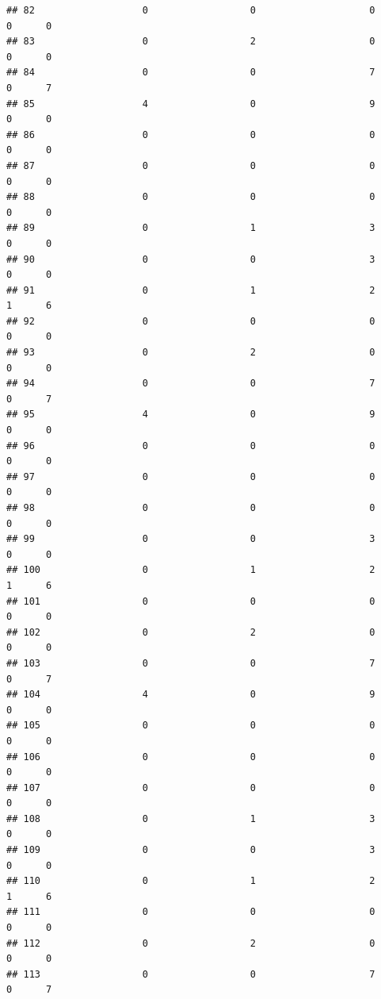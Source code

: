 \documentclass[
]{article}
\begin{document}
\begin{verbatim}
## 82                   0                  0                    0        0      0
## 83                   0                  2                    0        0      0
## 84                   0                  0                    7        0      7
## 85                   4                  0                    9        0      0
## 86                   0                  0                    0        0      0
## 87                   0                  0                    0        0      0
## 88                   0                  0                    0        0      0
## 89                   0                  1                    3        0      0
## 90                   0                  0                    3        0      0
## 91                   0                  1                    2        1      6
## 92                   0                  0                    0        0      0
## 93                   0                  2                    0        0      0
## 94                   0                  0                    7        0      7
## 95                   4                  0                    9        0      0
## 96                   0                  0                    0        0      0
## 97                   0                  0                    0        0      0
## 98                   0                  0                    0        0      0
## 99                   0                  0                    3        0      0
## 100                  0                  1                    2        1      6
## 101                  0                  0                    0        0      0
## 102                  0                  2                    0        0      0
## 103                  0                  0                    7        0      7
## 104                  4                  0                    9        0      0
## 105                  0                  0                    0        0      0
## 106                  0                  0                    0        0      0
## 107                  0                  0                    0        0      0
## 108                  0                  1                    3        0      0
## 109                  0                  0                    3        0      0
## 110                  0                  1                    2        1      6
## 111                  0                  0                    0        0      0
## 112                  0                  2                    0        0      0
## 113                  0                  0                    7        0      7

\end{verbatim}
\end{document}
